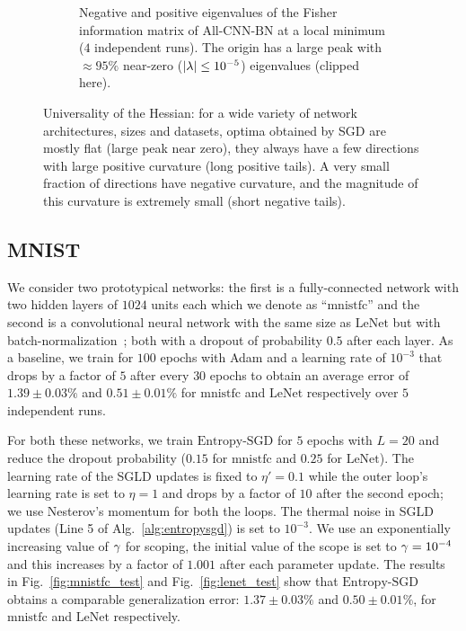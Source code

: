 \documentclass[10pt]{article}
\newcommand{\entropysgd}{\mathrm{Entropy}\textrm{-}\mathrm{SGD}}
\newcommand{\mnistfc}{\textrm{mnistfc}}
\newcommand{\lenet}{\textrm{LeNet}}
\newcommand{\allcnn}{\textrm{All-CNN-BN}}
\begin{document}
\begin{figure}[!tbh]
\begin{subfigure}[b]{\textwidth}
\begin{subfigure}[b]{0.44 \textwidth}
        \end{subfigure}
    \caption{\small Negative and positive eigenvalues of the Fisher information matrix of $\allcnn$ at a local minimum ($4$ independent runs). The origin has a large peak with $\approx 95\%$ near-zero ($\left| \lambda \right| \leq 10^{-5}$) eigenvalues (clipped here).}
    \label{fig:allcnn_hessian}
    \end{subfigure}
\caption{\small Universality of the Hessian: for a wide variety of network architectures, sizes and datasets, optima obtained by SGD are mostly flat (large peak near zero), they always have a few directions with large positive curvature (long positive tails). A very small fraction of directions have negative curvature, and the magnitude of this curvature is extremely small (short negative tails).}
\label{fig:universality}
\end{figure}

\subsection{MNIST}
\label{ss:expt:mnist}

We consider two prototypical networks: the first is a fully-connected network with two hidden layers of $1024$ units each which we denote as ``$\mnistfc$'' and the second is a convolutional neural network with the same size as $\lenet$ but with batch-normalization~\citep{ioffe2015batch}; both with a dropout of probability $0.5$ after each layer. As a baseline, we train for $100$ epochs with Adam and a learning rate of $10^{-3}$ that drops by a factor of $5$ after every $30$ epochs to obtain an average error of $1.39 \pm 0.03\%$ and $0.51 \pm 0.01 \%$ for $\mnistfc$ and $\lenet$ respectively over $5$ independent runs.

For both these networks, we train $\entropysgd$ for $5$ epochs with $L = 20$ and reduce the dropout probability ($0.15$ for $\mnistfc$ and $0.25$ for $\lenet$). The learning rate of the SGLD updates is fixed to $\eta' = 0.1$ while the outer loop's learning rate is set to $\eta=1$ and drops by a factor of $10$ after the second epoch; we use Nesterov's momentum for both the loops. The thermal noise in SGLD updates (Line 5 of Alg.~\ref{alg:entropysgd}) is set to $10^{-3}$. We use an exponentially increasing value of $\gamma$ for scoping, the initial value of the scope is set to $\gamma = 10^{-4}$ and this increases by a factor of $1.001$ after each parameter update. The results in Fig.~\ref{fig:mnistfc_test} and Fig.~\ref{fig:lenet_test} show that $\entropysgd$ obtains a comparable generalization error: $1.37 \pm 0.03 \%$ and $0.50 \pm 0.01 \%$, for $\mnistfc$ and $\lenet$ respectively.
\end{document}

